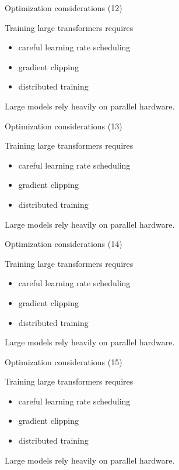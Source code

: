 \documentclass[aspectratio=169]{beamer}
\begin{document}
\begin{frame}{Optimization considerations (12)}

Training large transformers requires

\begin{itemize}
\item careful learning rate scheduling
\item gradient clipping
\item distributed training
\end{itemize}

Large models rely heavily on parallel hardware.

\end{frame}


\begin{frame}{Optimization considerations (13)}

Training large transformers requires

\begin{itemize}
\item careful learning rate scheduling
\item gradient clipping
\item distributed training
\end{itemize}

Large models rely heavily on parallel hardware.

\end{frame}


\begin{frame}{Optimization considerations (14)}

Training large transformers requires

\begin{itemize}
\item careful learning rate scheduling
\item gradient clipping
\item distributed training
\end{itemize}

Large models rely heavily on parallel hardware.

\end{frame}


\begin{frame}{Optimization considerations (15)}

Training large transformers requires

\begin{itemize}
\item careful learning rate scheduling
\item gradient clipping
\item distributed training
\end{itemize}

Large models rely heavily on parallel hardware.

\end{frame}
\end{document}
